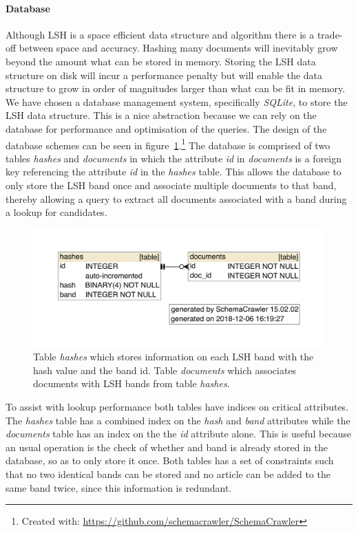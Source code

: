\paragraph{Database}
Although LSH is a space efficient data structure and algorithm there is a trade-off between space and accuracy. Hashing many documents will inevitably grow beyond the amount what can be stored in memory. Storing the LSH data structure on disk will incur a performance penalty but will enable the data structure to grow in order of magnitudes larger than what can be fit in memory. We have chosen a database management system, specifically \emph{SQLite}, to store the LSH data structure. This is a nice abstraction because we can rely on the database for performance and optimisation of the queries. The design of the database schemes can be seen in figure~\ref{fig:schema}.\footnote{Created with: \url{https://github.com/schemacrawler/SchemaCrawler}} The database is comprised of two tables \emph{hashes} and \emph{documents} in which the attribute \emph{id} in \emph{documents} is a foreign key referencing the attribute \emph{id} in the \emph{hashes} table. This allows the database to only store the LSH band once and associate multiple documents to that band, thereby allowing a query to extract all documents associated with a band during a lookup for candidates. 

\begin{figure}[ht]
	\centering
    \includegraphics[width = 0.8\linewidth]{docs/report/input/schema.pdf}
    \captionsetup{width = \linewidth}
    \caption{Table \emph{hashes} which stores information on each LSH band with the hash value and the band id. Table \emph{documents} which associates documents with LSH bands from table \emph{hashes}.}
    \label{fig:schema}
\end{figure}

To assist with lookup performance both tables have indices on critical attributes. The \emph{hashes} table has a combined index on the \emph{hash} and \emph{band} attributes while the \emph{documents} table has an index on the the \emph{id} attribute alone. This is useful because an usual operation is the check of whether and band is already stored in the database, so as to only store it once. Both tables has a set of constraints such that no two identical bands can be stored and no article can be added to the same band twice, since this information is redundant.


